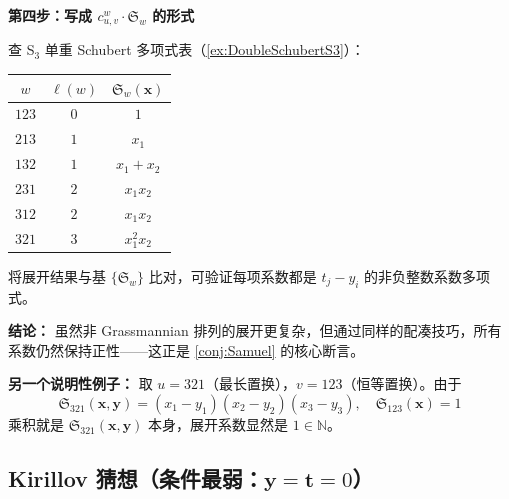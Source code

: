 \begin{Example}
\textbf{第四步：写成 $c^w_{u,v} \cdot \mathfrak{S}_w$ 的形式}

查 S$_3$ 单重 Schubert 多项式表（\cref{ex:DoubleSchubertS3}）：
\begin{center}
\begin{tabular}{c|c|c}
$w$ & $\ell(w)$ & $\mathfrak{S}_w(\mathbf{x})$ \\ \hline
$123$ & $0$ & $1$ \\
$213$ & $1$ & $x_1$ \\
$132$ & $1$ & $x_1 + x_2$ \\
$231$ & $2$ & $x_1 x_2$ \\
$312$ & $2$ & $x_1 x_2$ \\
$321$ & $3$ & $x_1^2 x_2$
\end{tabular}
\end{center}

将展开结果与基 $\{\mathfrak{S}_w\}$ 比对，可验证每项系数都是 $t_j - y_i$ 的非负整数系数多项式。

\textbf{结论：} 虽然非 Grassmannian 排列的展开更复杂，但通过同样的配凑技巧，所有系数仍然保持正性——这正是 \cref{conj:Samuel} 的核心断言。

\textbf{另一个说明性例子：} 取 $u = 321$（最长置换），$v = 123$（恒等置换）。由于
$$\mathfrak{S}_{321}(\mathbf{x},\mathbf{y}) = (x_1-y_1)(x_2-y_2)(x_3-y_3), \quad \mathfrak{S}_{123}(\mathbf{x}) = 1$$
乘积就是 $\mathfrak{S}_{321}(\mathbf{x},\mathbf{y})$ 本身，展开系数显然是 $1 \in \mathbb{N}$。
\end{Example}

\subsection{Kirillov 猜想（条件最弱：$\mathbf{y} = \mathbf{t} = 0$）}

